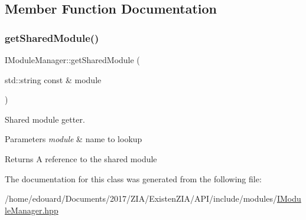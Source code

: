 \subsection{Member Function Documentation}
\mbox{\label{classxzia_1_1IModuleManager_a56addcdec0c0b32595807672705b414b}} 
\subsubsection{\texorpdfstring{get\+Shared\+Module()}{getSharedModule()}}
{\footnotesize\ttfamily I\+Module\+Manager\+::get\+Shared\+Module (\begin{DoxyParamCaption}\item[{std\+::string const \&}]{module }\end{DoxyParamCaption})\hspace{0.3cm}{\ttfamily [pure virtual]}}



Shared module getter. 


\begin{DoxyParams}{Parameters}
{\em module} & name to lookup \\
\hline
\end{DoxyParams}
\begin{DoxyReturn}{Returns}
A reference to the shared module 
\end{DoxyReturn}


The documentation for this class was generated from the following file\+:\begin{DoxyCompactItemize}
\item 
/home/edouard/\+Documents/2017/\+Z\+I\+A/\+Existen\+Z\+I\+A/\+A\+P\+I/include/modules/\mbox{\hyperlink{IModuleManager_8hpp}{I\+Module\+Manager.\+hpp}}\end{DoxyCompactItemize}
